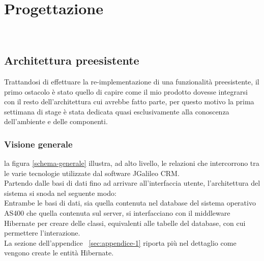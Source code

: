 \null\newpage
\chapter{Progettazione}
\label{cap:progettazione}

\\ %

\section{Architettura preesistente}
Trattandosi di effettuare la re-implementazione di una funzionalità preesistente, il primo ostacolo è stato quello di capire come il mio prodotto dovesse integrarsi con il resto dell'architettura cui avrebbe fatto parte, per questo motivo la prima settimana di stage è stata dedicata quasi esclusivamente alla conoscenza dell'ambiente e delle componenti. \\

\subsection{Visione generale}


la figura \ref{schema-generale} illustra, ad alto livello, le relazioni che intercorrono tra le varie tecnologie utilizzate dal software JGalileo CRM.\\
Partendo dalle basi di dati fino ad arrivare all'interfaccia utente, l'architettura del sistema si snoda nel seguente modo:\\
Entrambe le basi di dati, sia quella contenuta nel database del sistema operativo AS400 che quella contenuta sul server, si interfacciano con il \gls{middleware} Hibernate per creare delle classi, equivalenti alle tabelle del database, con cui permettere l'interazione.\\ 
La sezione dell'appendice ~\ref{sec:appendice-1} riporta più nel dettaglio come vengono create le entità Hibernate.\\

\newpage

